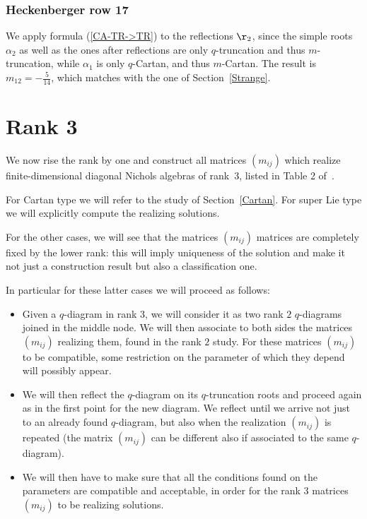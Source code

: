 \documentclass[pdftex]{sigma}%
\numberwithin{equation}{section}
\begin{document}
\subsubsection*{Heckenberger row 17}
We apply formula (\ref{CA-TR->TR}) to the reflections $\r_2$, since the simple roots $\alpha_2$ as well as the ones after reflections are only $q$-truncation and thus $m$-truncation, while $\alpha_1$ is only $q$-Cartan, and thus $m$-Cartan. The result is $m_{12}=-\frac{5}{14}$, which matches with the one of Section~\ref{Strange}.

\section{Rank 3}\label{rank3}
We now rise the rank by one and construct all matrices $(m_{ij})$ which realize finite-dimensional diagonal Nichols algebras of rank~$3$, listed in Table 2 of~\cite{Hecklist}.

For Cartan type we will refer to the study of Section~\ref{Cartan}.
For super Lie type we will explicitly compute the realizing solutions.

For the other cases, we will see that the matrices $(m_{ij})$ matrices are completely fixed by the lower rank: this will imply uniqueness of the solution and make it not just a construction result but also a classification one.

In particular for these latter cases we will proceed as follows:
\begin{itemize}\itemsep=0pt
 	\item Given a $q$-diagram in rank $3$, we will consider it as two rank $2$ $q$-diagrams joined in the middle node. We will then associate to both sides the matrices $(m_{ij})$ realizing them, found in the rank $2$ study.
For these matrices $(m_{ij})$ to be compatible, some restriction on the parameter of which they depend will possibly appear.
 	\item We will then reflect the $q$-diagram on its $q$-truncation roots and proceed again as in the first point for the new diagram.
 	We reflect until we arrive not just to an already found $q$-diagram, but also when the realization $(m_{ij})$ is repeated (the matrix $(m_{ij})$ can be different also if associated to the same $q$-diagram).
 	\item We will then have to make sure that all the conditions found on the parameters are compatible and acceptable, in order for the rank $3$ matrices $(m_{ij})$ to be realizing solutions.
\end{itemize}
\end{document}
